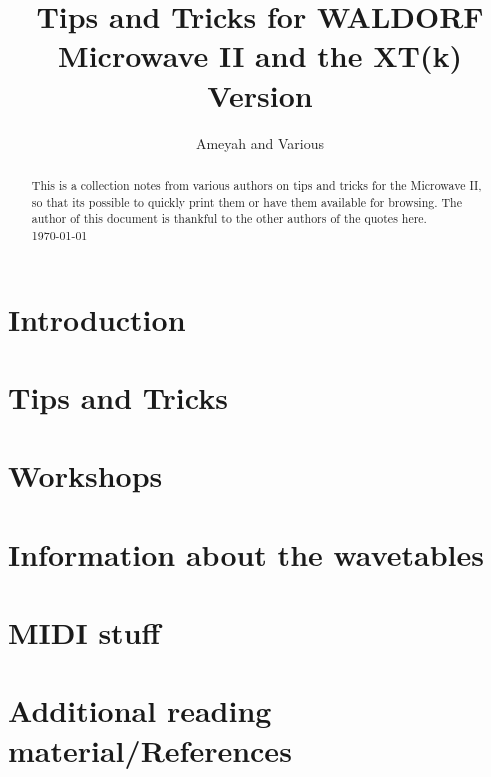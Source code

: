 \documentclass[a4paper,12pt,leqno]{article}%
\title{Tips and Tricks for WALDORF Microwave II and the XT(k) Version}
\author{Ameyah and Various}
\theoremstyle{plain}
\begin{document}
\maketitle
\begin{abstract}
	\noindent
	This is a collection notes from various authors on tips and tricks for the Microwave II, so that its possible to quickly print them or have them available for browsing. The author of this document is thankful to the other authors of the quotes here.\\
	\today
\end{abstract}

\newpage

\tableofcontents

\newpage

\section{Introduction}

\section{Tips and Tricks}

\section{Workshops}

\section{Information about the wavetables}

\section{MIDI stuff}

\section{Additional reading material/References}

\end{document}
